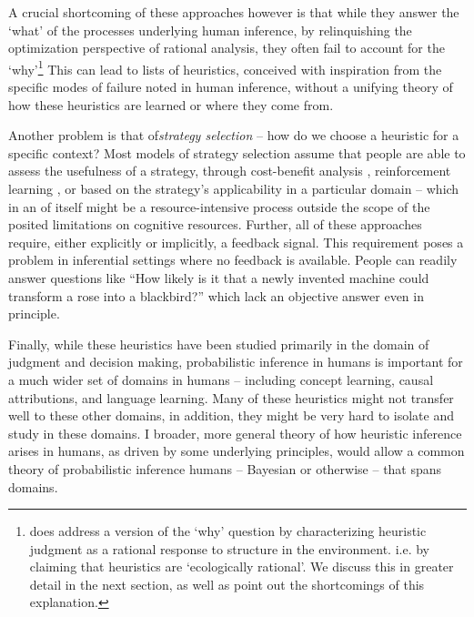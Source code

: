 A crucial shortcoming of these approaches however is that while they answer the `what' of the processes underlying human inference, by relinquishing the optimization perspective of rational analysis, they often fail to account for the `why'\footnote{\citet{gigerenzer2008heuristics} does address a version of the `why' question by characterizing heuristic judgment as a rational response to structure in the environment. i.e. by claiming that heuristics are `ecologically rational'. We discuss this in greater detail in the next section, as well as point out the shortcomings of this explanation.} This can lead to lists of heuristics, conceived with inspiration from the specific modes of failure noted in human inference, without a unifying theory of how these heuristics are learned or where they come from. 

Another problem is that of\emph{strategy selection} \citep{gigerenzer2008heuristics, marewski2014strategy} -- how do we choose a heuristic for a specific context? Most models of strategy selection assume that people are able to assess the usefulness of a strategy, through cost-benefit analysis \citep{johnson85, beach1978contingency, lieder2017strategy}, reinforcement learning \citep{erev05, rieskamp06}, or based on the strategy's applicability in a particular domain \citep{marewski2011cognitive, schulz2016simple} -- which in an of itself might be a resource-intensive process outside the scope of the posited limitations on cognitive resources. Further, all of these approaches require, either explicitly or implicitly, a feedback signal. This requirement poses a problem in inferential settings where no feedback is available. People can readily answer questions like ``How likely is it that a newly invented machine could transform a rose into a blackbird?'' \citep{Griffiths15} which lack an objective answer even in principle. 


Finally, while these heuristics have been studied primarily in the domain of judgment and decision making, probabilistic inference in humans is important for a much wider set of domains in humans -- including concept learning, causal attributions, and language learning. Many of these heuristics might not transfer well to these other domains, in addition, they might be very hard to isolate and study in these domains. I broader, more general theory of how heuristic inference arises in humans, as driven by some underlying principles, would allow a common theory of probabilistic inference humans -- Bayesian or otherwise -- that spans domains.
%

